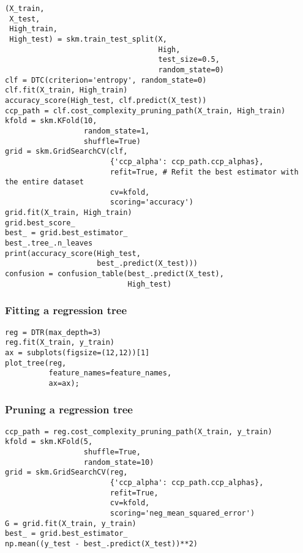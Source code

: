 \documentclass[
  letterpaper,
  DIV=11,
  numbers=noendperiod]{scrreprt}
\begin{document}
\begin{verbatim}
(X_train,
 X_test,
 High_train,
 High_test) = skm.train_test_split(X,
                                   High,
                                   test_size=0.5,
                                   random_state=0)
clf = DTC(criterion='entropy', random_state=0)
clf.fit(X_train, High_train)
accuracy_score(High_test, clf.predict(X_test))
ccp_path = clf.cost_complexity_pruning_path(X_train, High_train)
kfold = skm.KFold(10,
                  random_state=1,
                  shuffle=True)
grid = skm.GridSearchCV(clf,
                        {'ccp_alpha': ccp_path.ccp_alphas},
                        refit=True, # Refit the best estimator with the entire dataset
                        cv=kfold,
                        scoring='accuracy')
grid.fit(X_train, High_train)
grid.best_score_
best_ = grid.best_estimator_
best_.tree_.n_leaves
print(accuracy_score(High_test,
                     best_.predict(X_test)))
confusion = confusion_table(best_.predict(X_test),
                            High_test)
\end{verbatim}

\subsubsection{Fitting a regression
tree}\label{fitting-a-regression-tree}

\begin{verbatim}
reg = DTR(max_depth=3)
reg.fit(X_train, y_train)
ax = subplots(figsize=(12,12))[1]
plot_tree(reg,
          feature_names=feature_names,
          ax=ax);
\end{verbatim}

\subsubsection{Pruning a regression
tree}\label{pruning-a-regression-tree}

\begin{verbatim}
ccp_path = reg.cost_complexity_pruning_path(X_train, y_train)
kfold = skm.KFold(5,
                  shuffle=True,
                  random_state=10)
grid = skm.GridSearchCV(reg,
                        {'ccp_alpha': ccp_path.ccp_alphas},
                        refit=True,
                        cv=kfold,
                        scoring='neg_mean_squared_error')
G = grid.fit(X_train, y_train)
best_ = grid.best_estimator_
np.mean((y_test - best_.predict(X_test))**2)
\end{verbatim}
\end{document}
